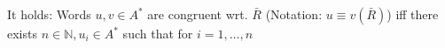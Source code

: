 It holds: Words $u, v \in A^*$ are congruent wrt. $\bar{R}$ (Notation: $u
\equiv v (\bar{R})$) iff there exists $n \in \mathbb{N}, u_i \in A^*$ such that
for $i = 1, \ldots, n$



















































